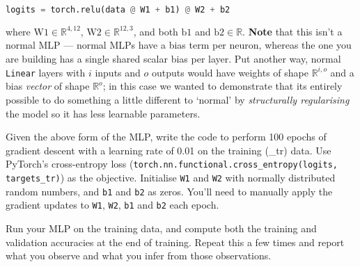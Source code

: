 \documentclass[a4paper]{article}
\begin{document}
\begin{lstlisting}[language=Python]
	logits = torch.relu(data @ W1 + b1) @ W2 + b2
\end{lstlisting}

where $\mathrm{W1} \in \mathbb{R}^{4,12}$, $\mathrm{W2} \in \mathbb{R}^{12,3}$, and both $\mathrm{b1}$ and $\mathrm{b2} \in \mathbb{R}$. \textbf{Note} that this isn't a normal MLP --- normal MLPs have a bias term per neuron, whereas the one you are building has a single shared scalar bias per layer. Put another way, normal \verb|Linear| layers with $i$ inputs and $o$ outputs would have weights of shape $\mathbb{R}^{i,o}$ and a bias \emph{vector} of shape $\mathbb{R}^{o}$; in this case we wanted to demonstrate that its entirely possible to do something a little different to `normal' by \emph{structurally regularising} the model so it has less learnable parameters.

\begin{tcolorbox}[title=2.1 Implement the MLP (1 mark)]
Given the above form of the MLP, write the code to perform 100 epochs of gradient descent with a learning rate of 0.01 on the training (\_tr) data. Use PyTorch's cross-entropy loss (\texttt{torch.nn.functional.cross\_entropy(logits, targets\_tr)}) as the objective. Initialise \texttt{W1} and \texttt{W2} with normally distributed random numbers, and \texttt{b1} and \texttt{b2} as zeros. You'll need to manually apply the gradient updates to \texttt{W1}, \texttt{W2}, \texttt{b1} and \texttt{b2} each epoch.
\end{tcolorbox}

\begin{tcolorbox}[title=2.2 Test the MLP (1 mark)]
Run your MLP on the training data, and compute both the training and validation accuracies at the end of training. Repeat this a few times and report what you observe and what you infer from those observations. 
\end{tcolorbox}
\end{document}
